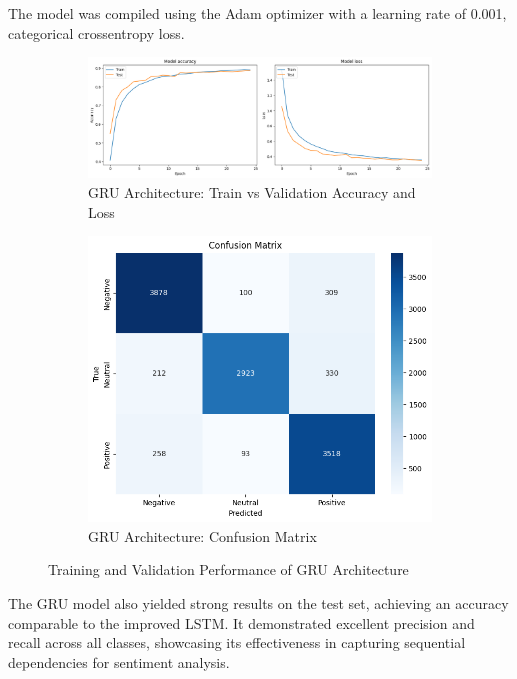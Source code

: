 The model was compiled using the Adam optimizer with a learning rate of 0.001, categorical crossentropy loss.

\begin{figure}[h!]
\centering
\begin{subfigure}[t]{0.48\textwidth}
\centering
\includegraphics[width=\textwidth]{./images/gru-acc.png}
\caption{GRU Architecture: Train vs Validation Accuracy and Loss}
\label{fig:cnn22_accuracy}
\end{subfigure}
\hfill
\begin{subfigure}[t]{0.30\textwidth}
\centering
\includegraphics[width=\textwidth]{./images/gru-cm.png}
\caption{GRU Architecture: Confusion Matrix}
\label{fig:cnn24_loss}
\end{subfigure}
\caption{Training and Validation Performance of GRU Architecture}
\label{fig:cnn22_performance}
\end{figure}

The GRU model also yielded strong results on the test set, achieving an accuracy comparable to the improved LSTM. It demonstrated excellent precision and recall across all classes, showcasing its effectiveness in capturing sequential dependencies for sentiment analysis.

